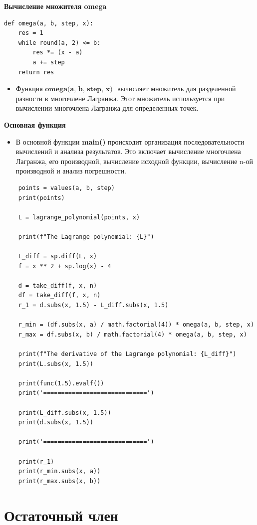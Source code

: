 \documentclass{article}
\begin{document}
\textbf{\large{Вычисление множителя omega}}
\begin{lstlisting}
def omega(a, b, step, x):
    res = 1
    while round(a, 2) <= b:
        res *= (x - a)
        a += step
    return res
\end{lstlisting}
\begin{itemize}
\item Функция $\textbf{omega(a, b, step, x) }$ вычисляет множитель для разделенной разности в многочлене Лагранжа. Этот множитель используется при вычислении многочлена Лагранжа для определенных точек.
\end{itemize} 

\textbf{\large{Основная функция}}
\begin{itemize}
\item В основной функции \textbf{main()} происходит организация последовательности вычислений и анализа результатов. Это включает вычисление многочлена Лагранжа, его производной, вычисление исходной функции, вычисление n-ой производной и анализ погрешности.
\end{itemize} 
\begin{lstlisting}
    points = values(a, b, step)
    print(points)

    L = lagrange_polynomial(points, x)

    print(f"The Lagrange polynomial: {L}")

    L_diff = sp.diff(L, x)
    f = x ** 2 + sp.log(x) - 4

    d = take_diff(f, x, n)
    df = take_diff(f, x, n)
    r_1 = d.subs(x, 1.5) - L_diff.subs(x, 1.5)
    
    r_min = (df.subs(x, a) / math.factorial(4)) * omega(a, b, step, x)
    r_max = df.subs(x, b) / math.factorial(4) * omega(a, b, step, x)
    
    print(f"The derivative of the Lagrange polynomial: {L_diff}")
    print(L.subs(x, 1.5))

    print(func(1.5).evalf())
    print('=============================')
    
    print(L_diff.subs(x, 1.5))
    print(d.subs(x, 1.5))
    
    print('=============================')
    
    print(r_1)
    print(r_min.subs(x, a))
    print(r_max.subs(x, b))
\end{lstlisting}

\section{Остаточный член}
\end{document}
